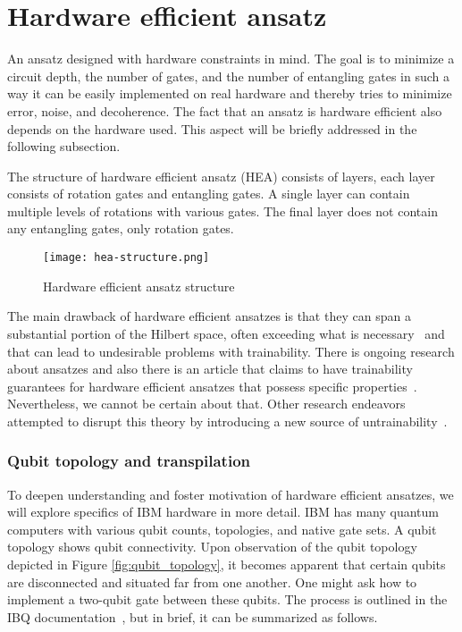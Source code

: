 \section{Hardware efficient ansatz}
An ansatz designed with hardware constraints in mind. The goal is to minimize a circuit depth, the number of gates, and the number of entangling gates in such a way it can be easily implemented on real hardware and thereby tries to minimize error, noise, and decoherence. The fact that an ansatz is hardware efficient also depends on the hardware used. This aspect will be briefly addressed in the following subsection.

The structure of hardware efficient ansatz (HEA) consists of layers, each layer consists of rotation gates and entangling gates. A single layer can contain multiple levels of rotations with various gates. The final layer does not contain any entangling gates, only rotation gates. 

\begin{figure}[H]
    \centering
    \texttt{[image: hea-structure.png]}       
    \caption{Hardware efficient ansatz structure~\cite{img:hea}}     
\end{figure}
The main drawback of hardware efficient ansatzes is that they can span a substantial portion of the Hilbert space, often exceeding what is necessary~\cite{holmes2022} and that can lead to undesirable problems with trainability. There is ongoing research about ansatzes and also there is an article that claims to have trainability guarantees for hardware efficient ansatzes that possess specific properties~\cite{shallow}. Nevertheless, we cannot be certain about that. Other research endeavors attempted to disrupt this theory by introducing a new source of untrainability~\cite{hea-practical}.

\subsubsection{Qubit topology and transpilation}
To deepen understanding and foster motivation of hardware efficient ansatzes, we will explore specifics of IBM hardware in more detail. IBM has many quantum computers with various qubit counts, topologies, and native gate sets. A qubit topology shows qubit connectivity. Upon observation of the qubit topology depicted in Figure \ref{fig:qubit_topology}, it becomes apparent that certain qubits are disconnected and situated far from one another. One might ask how to implement a two-qubit gate between these qubits. The process is outlined in the IBQ documentation~\cite{transpiler,native_gates}, but in brief, it can be summarized as follows.

